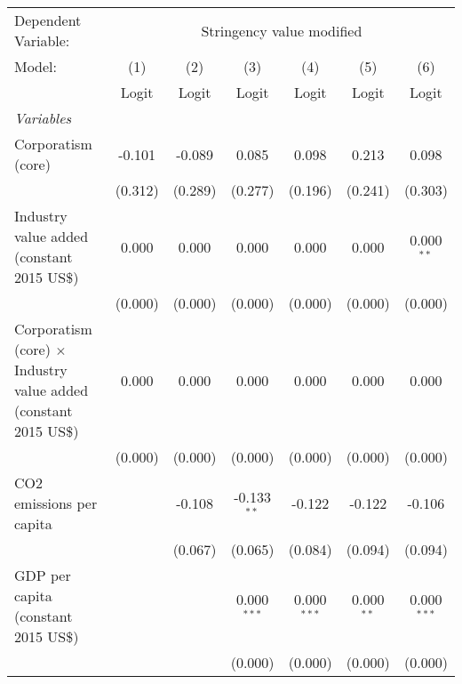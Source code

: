 
\begingroup
\centering
\begin{tabular}{lcccccc}
   \toprule
   Dependent Variable: & \multicolumn{6}{c}{Stringency value modified}\\
   Model:                                                                  & (1)     & (2)     & (3)           & (4)           & (5)          & (6)\\  
                                                                           &  Logit  & Logit   & Logit         & Logit         & Logit        & Logit\\  
   \midrule
   \emph{Variables}\\
   Corporatism (core)                                                      & -0.101  & -0.089  & 0.085         & 0.098         & 0.213        & 0.098\\   
                                                                           & (0.312) & (0.289) & (0.277)       & (0.196)       & (0.241)      & (0.303)\\   
   Industry value added (constant 2015 US\$)                               & 0.000   & 0.000   & 0.000         & 0.000         & 0.000        & 0.000$^{**}$\\   
                                                                           & (0.000) & (0.000) & (0.000)       & (0.000)       & (0.000)      & (0.000)\\   
   Corporatism (core) $\times$ Industry value added (constant 2015 US\$)   & 0.000   & 0.000   & 0.000         & 0.000         & 0.000        & 0.000\\   
                                                                           & (0.000) & (0.000) & (0.000)       & (0.000)       & (0.000)      & (0.000)\\   
   CO2 emissions per capita                                                &         & -0.108  & -0.133$^{**}$ & -0.122        & -0.122       & -0.106\\   
                                                                           &         & (0.067) & (0.065)       & (0.084)       & (0.094)      & (0.094)\\   
   GDP per capita (constant 2015 US\$)                                     &         &         & 0.000$^{***}$ & 0.000$^{***}$ & 0.000$^{**}$ & 0.000$^{***}$\\   
                                                                           &         &         & (0.000)       & (0.000)       & (0.000)      & (0.000)\\   

\end{tabular}

